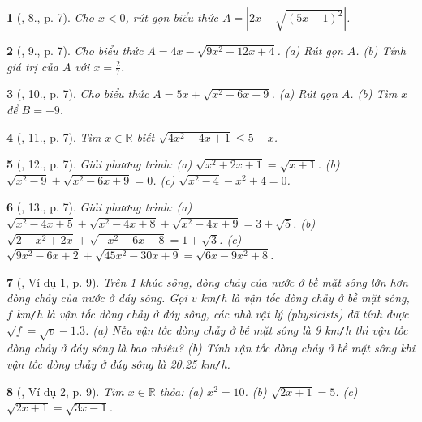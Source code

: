 \documentclass{article}
\newtheorem{baitoan}{}%
\begin{document}
\begin{baitoan}[\cite{Tuyen_Toan_9_old}, 8., p. 7]
	Cho $x < 0$, rút gọn biểu thức $A = |2x - \sqrt{(5x - 1)^2}|$.
\end{baitoan}

\begin{baitoan}[\cite{Tuyen_Toan_9_old}, 9., p. 7]
	Cho biểu thức $A = 4x - \sqrt{9x^2 - 12x + 4}$. (a) Rút gọn $A$. (b) Tính giá trị của $A$ với $x = \frac{2}{7}$.
\end{baitoan}

\begin{baitoan}[\cite{Tuyen_Toan_9_old}, 10., p. 7]
	Cho biểu thức $A = 5x + \sqrt{x^2 + 6x + 9}$. (a) Rút gọn $A$. (b) Tìm $x$ để $B = -9$.
\end{baitoan}

\begin{baitoan}[\cite{Tuyen_Toan_9_old}, 11., p. 7]
	Tìm $x\in\mathbb{R}$ biết $\sqrt{4x^2 - 4x + 1}\le5 - x$.
\end{baitoan}

\begin{baitoan}[\cite{Tuyen_Toan_9_old}, 12., p. 7]
	Giải phương trình: (a) $\sqrt{x^2 + 2x + 1} = \sqrt{x + 1}$. (b) $\sqrt{x^2 - 9} + \sqrt{x^2 - 6x + 9} = 0$. (c) $\sqrt{x^2 - 4} - x^2 + 4 = 0$.
\end{baitoan}

\begin{baitoan}[\cite{Tuyen_Toan_9_old}, 13., p. 7]
	Giải phương trình: (a) $\sqrt{x^2 - 4x + 5} + \sqrt{x^2 - 4x + 8} + \sqrt{x^2 - 4x + 9} = 3 + \sqrt{5}$. (b) $\sqrt{2 - x^2 + 2x} + \sqrt{-x^2 - 6x - 8} = 1 + \sqrt{3}$. (c) $\sqrt{9x^2 - 6x + 2} + \sqrt{45x^2 - 30x + 9} = \sqrt{6x - 9x^2 + 8}$. 
\end{baitoan}

\begin{baitoan}[\cite{Binh_boi_duong_Toan_9_tap_1}, Ví dụ 1, p. 9]
	Trên 1 khúc sông, dòng chảy của nước ở bề mặt sông lớn hơn dòng chảy của nước ở đáy sông. Gọi $v$ {\rm km{\tt/}h} là vận tốc dòng chảy ở bề mặt sông, $f$ {\rm km{\tt/}h} là vận tốc dòng chảy ở đáy sông, các nhà vật lý (physicists) đã tính được $\sqrt{f} = \sqrt{v} - 1.3$. (a) Nếu vận tốc dòng chảy ở bề mặt sông là {\rm9 km{\tt/}h} thì vận tốc dòng chảy ở đáy sông là bao nhiêu? (b) Tính vận tốc dòng chảy ở bề mặt sông khi vận tốc dòng chảy ở đáy sông là {\rm20.25 km{\tt/}h}.
\end{baitoan}

\begin{baitoan}[\cite{Binh_boi_duong_Toan_9_tap_1}, Ví dụ 2, p. 9]
	Tìm $x\in\mathbb{R}$ thỏa: (a) $x^2 = 10$. (b) $\sqrt{2x + 1} = 5$. (c) $\sqrt{2x + 1} = \sqrt{3x - 1}$.
\end{baitoan}
\end{document}
